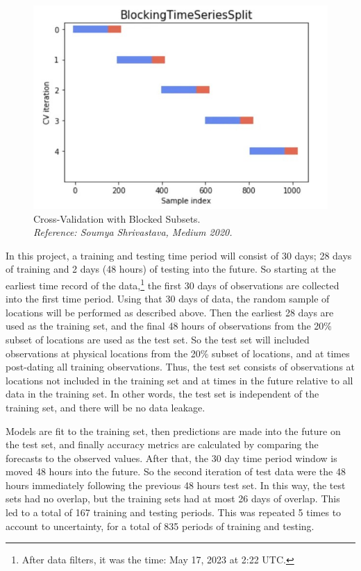 \documentclass[11pt]{article}%
\begin{document}
\begin{figure}[ht]
    \centering
    \includegraphics[width=1\textwidth]{images/cv.jpg}
    \caption[CV Method]{Cross-Validation with Blocked Subsets.\\ \textit{Reference: Soumya Shrivastava, Medium 2020.}}
    \label{fig:cv}
\end{figure}

In this project, a training and testing time period will consist of 30 days; 28 days of training and 2 days (48 hours) of testing into the future. So starting at the earliest time record of the data,\footnote{After data filters, it was the time: May 17, 2023 at 2:22 UTC.} the first 30 days of observations are collected into the first time period. Using that 30 days of data, the random sample of locations will be performed as described above. Then the earliest 28 days are used as the training set, and the final 48 hours of observations from the 20\% subset of locations are used as the test set. So the test set will included observations at physical locations from the 20\% subset of locations, and at times post-dating all training observations. Thus, the test set consists of observations at locations not included in the training set and at times in the future relative to all data in the training set. In other words, the test set is independent of the training set, and there will be no data leakage. 

Models are fit to the training set, then predictions are made into the future on the test set, and finally accuracy metrics are calculated by comparing the forecasts to the observed values. After that, the 30 day time period window is moved 48 hours into the future. So the second iteration of test data were the 48 hours immediately following the previous 48 hours test set. In this way, the test sets had no overlap, but the training sets had at most 26 days of overlap. This led to a total of 167 training and testing periods. This was repeated 5 times to account to uncertainty, for a total of 835 periods of training and testing.
\end{document}
